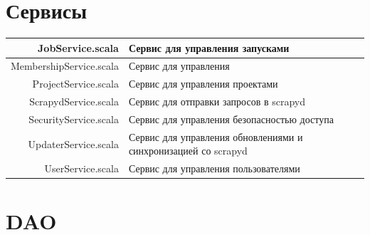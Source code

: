 \documentclass[a4paper,12pt]{article}
\begin{document}
	\section*{Сервисы}
	
	\begin{longtable}[]{|@{\textbf}r|p{7cm}|} 
	\hline
	JobService.scala & Сервис для управления запусками\\ \hline
MembershipService.scala & Сервис для управления\\ \hline
ProjectService.scala & Сервис для управления проектами\\ \hline
ScrapydService.scala & Сервис для отправки запросов в scrapyd \cite{scrapyd}\\ \hline
SecurityService.scala & Сервис для управления безопасностью доступа\\ \hline
UpdaterService.scala & Сервис для управления обновлениями и синхронизацией со scrapyd \cite{scrapyd}\\ \hline
UserService.scala & Сервис для управления пользователями\\ \hline

	\end{longtable}
	\section*{DAO}
	
\end{document}
